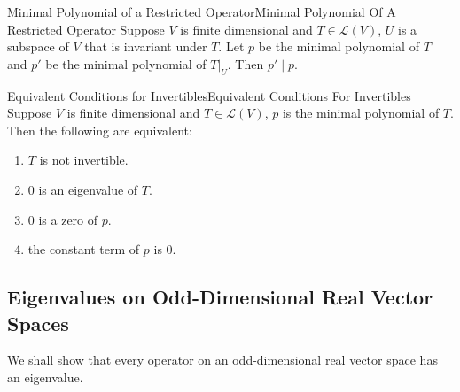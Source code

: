 \documentclass[../main.tex]{subfiles}
\begin{document}
\begin{corollary}{Minimal Polynomial of a Restricted Operator}{Minimal Polynomial Of A Restricted Operator}
Suppose $V$ is finite dimensional and $T\in \mathscr{L}(V)$, $U$ is a subspace of $V$ that is invariant under $T$. Let $p$ be the minimal polynomial of $T$ and $p'$ be the minimal polynomial of $T|_U$. Then $p'\mid p$.
\end{corollary}
\begin{theorem}{Equivalent Conditions for Invertibles}{Equivalent Conditions For Invertibles}
Suppose $V$ is finite dimensional and $T\in \mathscr{L}(V)$, $p$ is the minimal polynomial of $T$. Then the following are equivalent:
\begin{enumerate}
	\item $T$ is not invertible.
	\item  $0$ is an eigenvalue of $T$.
	\item $0$ is a zero of  $p$.
	\item the constant term of $p$ is $0$.
\end{enumerate}
\end{theorem}


\subsection{Eigenvalues on Odd-Dimensional Real Vector Spaces}
We shall show that every operator on an odd-dimensional real vector space has an eigenvalue.
\end{document}
